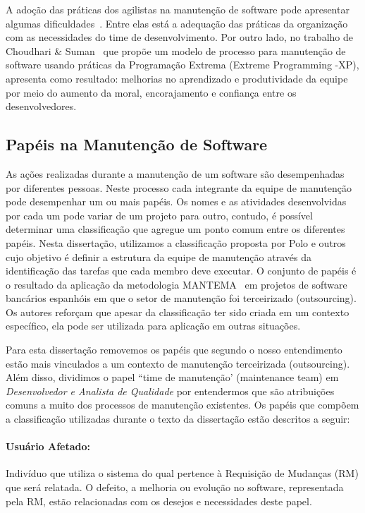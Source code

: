 A adoção das práticas dos agilistas na manutenção de software pode apresentar
algumas dificuldades~\cite{1402140}. Entre elas está a adequação das práticas da
organização com as necessidades do time de desenvolvimento. Por outro lado, no
trabalho de Choudhari \& Suman~\cite{Choudhari:2014:EIM:2557833.2557845} que
propõe um modelo de processo para manutenção de software usando práticas da
Programação Extrema (Extreme Programming \@-\@ XP), apresenta como resultado:
melhorias no aprendizado e produtividade da equipe por meio do aumento da moral,
encorajamento e confiança entre os desenvolvedores.

\subsection{Papéis na Manutenção de Software}
\label{subsec:man_visao_geral_papeis_na_manutencao_de_software}

As ações realizadas durante a manutenção de um software são desempenhadas por
diferentes pessoas. Neste processo cada integrante da equipe de manutenção pode
desempenhar um ou mais papéis. Os nomes e as atividades desenvolvidas por cada
um pode variar de um projeto para outro, contudo, é possível determinar uma
classificação que agregue um ponto comum entre os diferentes papéis. Nesta
dissertação, utilizamos a classificação proposta por Polo e
outros~\cite{Polo1999} cujo objetivo é definir a estrutura da equipe de
manutenção através da identificação das tarefas que cada membro deve executar.
O conjunto de papéis é o resultado da aplicação da metodologia
MANTEMA~\cite{756695} em projetos de software bancários espanhóis em que o setor
de manutenção foi terceirizado (outsourcing). Os autores reforçam que apesar da
classificação ter sido criada em um contexto específico, ela pode ser utilizada para
aplicação em outras situações.

Para esta dissertação removemos os papéis que segundo o nosso entendimento estão
mais vinculados a um contexto de manutenção terceirizada (outsourcing).  Além
disso, dividimos o papel ``time de manutenção' (maintenance team) em
\textit{Desenvolvedor e Analista de Qualidade} por entendermos que são
atribuições comuns a muito dos processos de manutenção existentes. Os papéis que
compõem a classificação utilizadas durante o texto da dissertação estão
descritos a seguir:

\paragraph{Usuário Afetado:}
Indivíduo que utiliza o sistema do qual pertence à Requisição de Mudanças (RM)
que será relatada. O defeito, a melhoria ou evolução no software, representada
pela RM, estão relacionadas com os desejos e necessidades deste papel.

